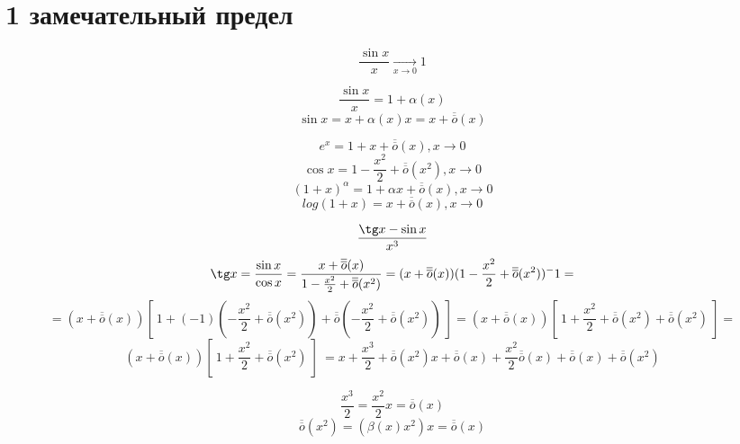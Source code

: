 \documentclass[12pt, paper]{article}
\begin{document}
\section{1 замечательный предел}
\[ \frac{\sin x}{x} \xrightarrow[x\to 0]{} 1 \]

\[ \frac{\sin x}{x} = 1 + \alpha(x) \]
\[\sin x = x + \alpha(x) x = x + \overline{\overline{o}}(x)\]

\[ e^x = 1 + x +\overline{\overline{o}}(x), x\to 0 \]
\[ \cos x = 1 - \frac{x^2}{2} +\overline{\overline{o}}(x^2), x\to 0 \]
\[ (1+x)^\alpha = 1 + \alpha x +\overline{\overline{o}}(x), x\to 0 \]
\[ log(1+x) = x +\overline{\overline{o}}(x), x\to 0 \]


\[ \frac{\tg x - \sin x}{x^3} \]
\[ \tg x = \frac{\sin x}{\cos x} = \frac{x +\overline{\overline{o}}(x)}{1 - \frac{x^2}{2} + \overline{\overline{o}}(x^2)} = (x + \overline{\overline{o}}(x))(1 - \frac{x^2}{2} + \overline{\overline{o}}(x^2))^-1 = \] 
\[ = (x +\overline{\overline{o}}(x))[\ 1 + (-1)(-\frac{x^2}{2} +\overline{\overline{o}}(x^2)) + \overline{\overline{o}}(-\frac{x^2}{2} + \overline{\overline{o}}(x^2))  \ ] =(x +\overline{\overline{o}}(x)) [\ 1 + \frac{x^2}{2} + \overline{\overline{o}}(x^2) + \overline{\overline{o}}(x^2)\ ] = \]
\[(x +\overline{\overline{o}}(x)) [\ 1 + \frac{x^2}{2} + \overline{\overline{o}}(x^2)\ ]  \ = x + \frac{x^3}{2} +\overline{\overline{o}}(x^2)x + \overline{\overline{o}}(x) + \frac{x^2}{2}\overline{\overline{o}}(x) +\overline{\overline{o}}(x) +\overline{\overline{o}}(x^2) \]

\[ \frac{x^3}{2} = \frac{x^2}{2}x = \overline{\overline{o}}(x) \]
\[ \overline{\overline{o}}(x^2) = (\beta(x)x^2)x = \overline{\overline{o}}(x) \]
\end{document}
